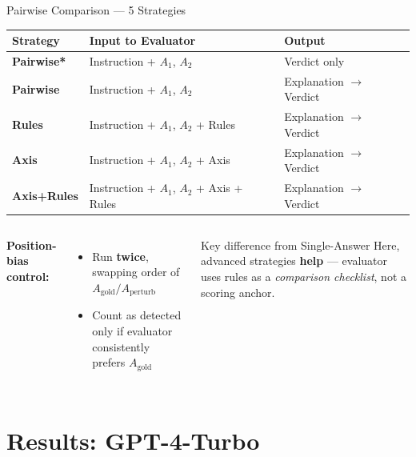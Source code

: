 \documentclass[aspectratio=169,10pt]{beamer}
\begin{document}
\begin{frame}{Pairwise Comparison — 5 Strategies}
  \begin{center}
  \small
  \begin{tabular}{llp{6cm}}
    \toprule
    \textbf{Strategy} & \textbf{Input to Evaluator} & \textbf{Output} \\
    \midrule
    \textbf{Pairwise*}     & Instruction + $A_1$, $A_2$ & Verdict only \\
    \textbf{Pairwise}      & Instruction + $A_1$, $A_2$ & Explanation $\to$ Verdict \\
    \textbf{Rules}         & Instruction + $A_1$, $A_2$ + Rules & Explanation $\to$ Verdict \\
    \textbf{Axis}          & Instruction + $A_1$, $A_2$ + Axis & Explanation $\to$ Verdict \\
    \textbf{Axis+Rules}    & Instruction + $A_1$, $A_2$ + Axis + Rules & Explanation $\to$ Verdict \\
    \bottomrule
  \end{tabular}
  \end{center}

  \vspace{0.5em}
  \begin{columns}[T]
      \textbf{Position-bias control:}
      \begin{itemize}
        \item Run \textbf{twice}, swapping order of $A_{\text{gold}} / A_{\text{perturb}}$
        \item Count as detected only if evaluator consistently prefers $A_{\text{gold}}$
      \end{itemize}
      \begin{block}{Key difference from Single-Answer}
        Here, advanced strategies \textbf{help} — evaluator uses rules as a \emph{comparison checklist}, not a scoring anchor.
      \end{block}
  \end{columns}
\end{frame}

\section{Results: GPT-4-Turbo}
\end{document}
